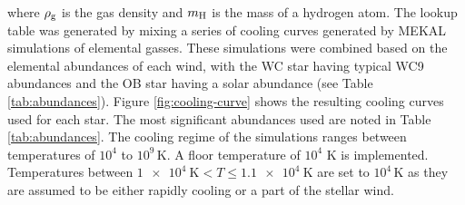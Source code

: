 \noindent
where $\rho_\text{g}$ is the gas density and $m_\text{H}$ is the mass of a hydrogen atom.
The lookup table was generated by mixing a series of cooling curves generated by MEKAL simulations of elemental gasses.
These simulations were combined based on the elemental abundances of each wind, with the WC star having typical WC9 abundances and the OB star having a solar abundance (see Table \ref{tab:abundances}).
%
%
Figure \ref{fig:cooling-curve} shows the resulting cooling curves used for each star.
The most significant abundances used are noted in Table \ref{tab:abundances}.
The cooling regime of the simulations ranges between temperatures of $10^4$ to $10^9\,\si{\kelvin}$.
A floor temperature of $10^4$ \si{\kelvin} is implemented.
Temperatures between $\SI{1e4}{\kelvin} < T \leq \SI{1.1e4}{\kelvin}$ are set to $10^4\,\si{\kelvin}$ as they are assumed to be either rapidly cooling or a part of the stellar wind.

